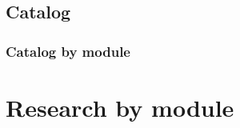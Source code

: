 \documentclass[10pt,a4paper,oneside]{article}
\begin{document}
\begin{landscape}
\part{Catalog}
\section{Catalog by module}

\end{landscape}

\part{Research by module}






\end{document}
